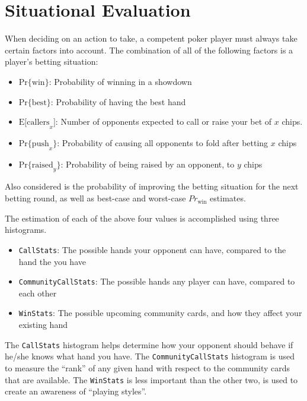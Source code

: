 
\clearpage




\chapter{Situational Evaluation}
\label{sec:SituationalEvaluation}

When deciding on an action to take, a competent poker player must always take certain factors into account.
The combination of all of the following factors is a player's betting situation:
\begin{itemize}
\singlespacing
\item $\mathrm{Pr\{win\}}$: Probability of winning in a showdown
\item $\mathrm{Pr\{best\}}$: Probability of having the best hand
\item $\mathrm{E[callers}_x]$: Number of opponents expected to call or raise your bet of $x$ chips.
\item $\mathrm{Pr\{push}_x\}$: Probability of causing all opponents to fold after betting $x$ chips
\item $\mathrm{Pr\{raised}_y\}$: Probability of being raised by an opponent, to $y$ chips
\end{itemize}
Also considered is the probability of improving the betting situation for the next betting round, as well as best-case and worst-case $Pr_\mathrm{win}$ estimates.

The estimation of each of the above four values is accomplished using three histograms.
\begin{itemize}
\singlespacing
\item \texttt{CallStats}: The possible hands your opponent can have, compared to the hand the you have
\item \texttt{CommunityCallStats}: The possible hands any player can have, compared to each other
\item \texttt{WinStats}: The possible upcoming community cards, and how they affect your existing hand
\end{itemize}
The \texttt{CallStats} histogram helps determine how your opponent should behave if he/she knows what hand you have.
The \texttt{CommunityCallStats} histogram is used to measure the ``rank'' of any given hand with respect to the community cards that are available.
The \texttt{WinStats} is less important than the other two, is used to create an awareness of ``playing styles''.

